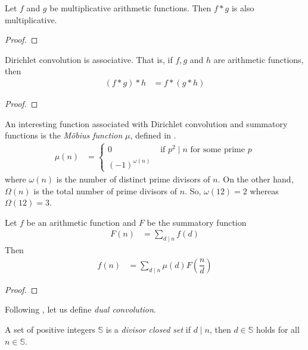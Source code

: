 \documentclass[elemannt.tex]{subfile}
\begin{document}
		\begin{theorem}
			Let $f$ and $g$ be multiplicative arithmetic functions. Then $f\ast g$ is also multiplicative.
		\end{theorem}
	
		\begin{proof}
			
		\end{proof}
	
		\begin{theorem}\label{thm:convass}
			Dirichlet convolution is associative. That is, if $f,g$ and $h$ are arithmetic functions, then
				\begin{align*}
					(f\ast g)\ast h
						& = f\ast (g\ast h)
				\end{align*}
		\end{theorem}
	
		\begin{proof}
			
		\end{proof}
	 An interesting function associated with Dirichlet convolution and summatory functions is the \textit{M\"{o}bius function} $\mu$, defined in \textcite{mobius_1832}.
		\begin{align*}
			\mu(n)
				& =
					\begin{cases}
						0& \mbox{ if }p^{2}\mid n\mbox{ for some prime }p\\
						(-1)^{\omega(n)}
					\end{cases}
		\end{align*}
	where $\omega(n)$ is the number of distinct prime divisors of $n$. On the other hand, $\Omega(n)$ is the total number of prime divisors of $n$. So, $\omega(12)=2$ whereas $\Omega(12)=3$.
		\begin{theorem}\label{thm:mobinv}
			Let $f$ be an arithmetic function and $F$ be the summatory function
				\begin{align*}
					F(n)
					& = \sum_{d\mid n}f(d)
				\end{align*}
			Then
				\begin{align*}
					f(n)
						& = \sum_{d\mid n}\mu(d)F\left(\dfrac{n}{d}\right)
				\end{align*}
		\end{theorem}
		
		\begin{proof}
			
		\end{proof}
	Following \textcite[Page $4$, Theorem $1.2.3$]{cojocaru_murty_2006}, let us define \textit{dual convolution}.
		\begin{definition}
			A set of positive integers $\mathbb{S}$ is a \textit{divisor closed set} if $d\mid n$, then $d\in\mathbb{S}$ holds for all $n\in\mathbb{S}$.
		\end{definition}
	
\end{document}
